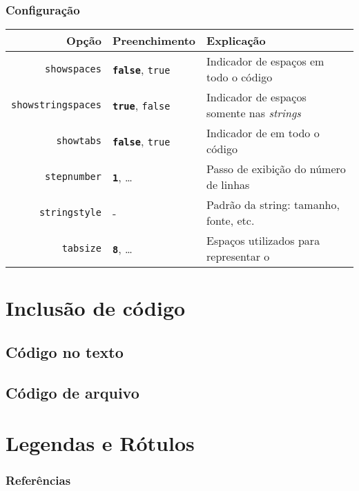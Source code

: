 \documentclass[brazilian]{beamer}
\begin{document}
\begin{frame}[fragile]
\end{frame}

\begin{frame}[fragile]
    \frametitle{Configuração}
\tiny
    \begin{table}
        \begin{tabular}{rC{2cm}O{6cm}}
            Opção & Preenchimento & Explicação \\ \hline
            \texttt{showspaces} & \texttt{\bfseries false}, \texttt{true} & Indicador de espaços em todo o código \\ \hline
            \texttt{showstringspaces} & \texttt{\bfseries true}, \texttt{false} & Indicador de espaços somente nas \textit{strings} \\ \hline
            \texttt{showtabs} & \texttt{\bfseries false}, \texttt{true} & Indicador de \keys{\tab} em todo o código \\ \hline
            \texttt{stepnumber} & \texttt{\bfseries 1}, \ldots & Passo de exibição do número de linhas \\ \hline
            \texttt{stringstyle} & - & Padrão da string: tamanho, fonte, etc. \\ \hline
            \texttt{tabsize} & \texttt{\bfseries 8}, \ldots & Espaços utilizados para representar o \keys{\tab} \\ \hline
        \end{tabular}
    \end{table}
\end{frame}

\section{Inclusão de código}
\subsection{Código no texto}
\subsection{Código de arquivo}

\section{Legendas e Rótulos}

\begin{frame}[allowframebreaks]
    \frametitle{Referências}

    \nocite{*}
    \printbibliography[keyword={inserirCodigos}]

\end{frame}
\end{document}

